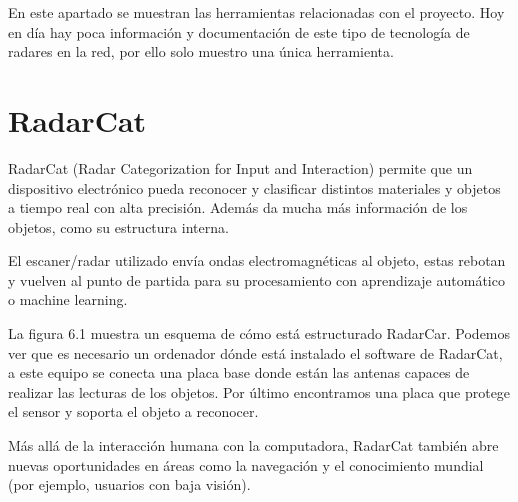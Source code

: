 
En este apartado se muestran las herramientas relacionadas con el proyecto.
Hoy en día hay poca información y documentación de este tipo de tecnología de radares en la red, por ello solo muestro una única herramienta.

\section{RadarCat}
RadarCat (Radar Categorization for Input and Interaction) permite que un dispositivo electrónico pueda reconocer y clasificar distintos materiales y objetos a tiempo real con alta precisión. Además da mucha más información de los objetos, como su estructura interna.

El escaner/radar utilizado envía ondas electromagnéticas al objeto, estas rebotan y vuelven al punto de partida para su procesamiento con aprendizaje automático o machine learning.

La figura 6.1 muestra un esquema de cómo está estructurado RadarCar. Podemos ver que es necesario un ordenador dónde está instalado el software de RadarCat, a este equipo se conecta una placa base donde están las antenas capaces de realizar las lecturas de los objetos.
Por último encontramos una placa que protege el sensor y soporta el objeto a reconocer.


Más allá de la interacción humana con la computadora, RadarCat también abre nuevas oportunidades en áreas como la navegación y el conocimiento mundial (por ejemplo, usuarios con baja visión).